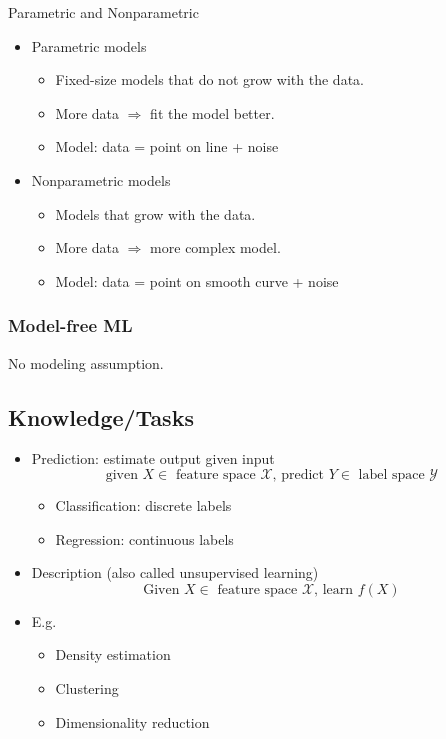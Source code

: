 \documentclass[letterpaper,10pt]{article}
\begin{document}
Parametric and Nonparametric
\begin{itemize}
	\item Parametric models
	\begin{itemize}
		\item Fixed-size models that do not grow with the data.
		\item More data $\Rightarrow$ fit the model better.
		\item Model: data = point on line + noise
	\end{itemize}
	\item Nonparametric models
	\begin{itemize}
		\item Models that grow with the data.
		\item More data $\Rightarrow$ more complex model.
		\item Model: data = point on smooth curve + noise
	\end{itemize}
\end{itemize}

\subsubsection{Model-free ML}

No modeling assumption.

\subsection{Knowledge/Tasks}

\begin{itemize}
	\item Prediction: estimate output given input
	$$\text{given } X\in \text{ feature space } \mathcal{X} \text{, predict } Y\in \text{ label space } \mathcal{Y}$$
	\begin{itemize}
		\item Classification: discrete labels
		\item Regression: continuous labels
	\end{itemize}
	\item Description (also called unsupervised learning)
	$$\text{Given }X\in\text{ feature space }\mathcal{X}\text{, learn }f(X) $$
	\item E.g.
	\begin{itemize}
		\item Density estimation
		\item Clustering
		\item Dimensionality reduction
	\end{itemize}
\end{itemize}
\end{document}

